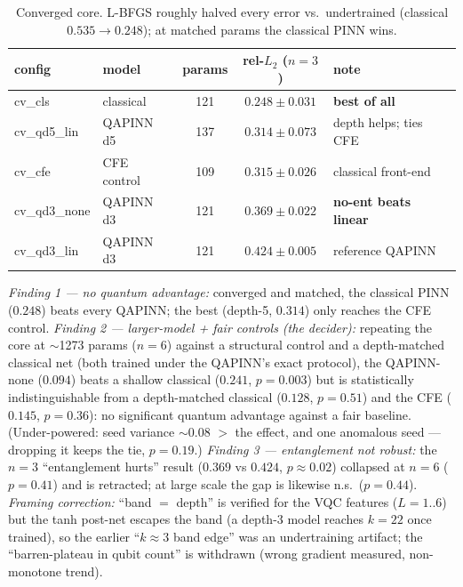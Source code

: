 \documentclass[11pt]{article}
\begin{document}
\begin{table}[h]\centering\small
\begin{tabular}{llcc l}
\toprule
config & model & params & rel-$L_2$ ($n{=}3$) & note \\ \midrule
cv\_cls      & classical    & 121 & $\mathbf{0.248 \pm 0.031}$ & \textbf{best of all} \\
cv\_qd5\_lin & QAPINN d5    & 137 & $0.314 \pm 0.073$ & depth helps; ties CFE \\
cv\_cfe      & CFE control  & 109 & $0.315 \pm 0.026$ & classical front-end \\
cv\_qd3\_none& QAPINN d3    & 121 & $0.369 \pm 0.022$ & \textbf{no-ent beats linear} \\
cv\_qd3\_lin & QAPINN d3    & 121 & $0.424 \pm 0.005$ & reference QAPINN \\
\bottomrule
\end{tabular}
\caption{Converged core. L-BFGS roughly halved every error vs.\ undertrained
(classical $0.535\!\to\!0.248$); at matched params the classical PINN wins.}
\label{tab:converged}
\end{table}

\emph{Finding 1 --- no quantum advantage:} converged and matched, the classical PINN
($0.248$) beats every QAPINN; the best (depth-5, $0.314$) only reaches the CFE
control. \emph{Finding 2 --- larger-model + fair controls (the decider):} repeating
the core at $\sim$1273 params ($n=6$) against a structural control and a
depth-matched classical net (both trained under the QAPINN's exact protocol), the
QAPINN-none ($0.094$) beats a shallow classical ($0.241$, $p=0.003$) but is
statistically indistinguishable from a depth-matched classical ($0.128$, $p=0.51$)
and the CFE ($0.145$, $p=0.36$): no significant quantum advantage against a fair
baseline. (Under-powered: seed variance $\sim$0.08 $>$ the effect, and one anomalous
seed --- dropping it keeps the tie, $p=0.19$.) \emph{Finding 3 --- entanglement not robust:} the
$n=3$ ``entanglement hurts'' result ($0.369$ vs $0.424$, $p\approx0.02$) collapsed at
$n=6$ ($p=0.41$) and is retracted; at large scale the gap is likewise n.s.\ ($p=0.44$).
\emph{Framing correction:} ``band $=$ depth'' is verified for the VQC features
($L{=}1..6$) but the tanh post-net escapes the band (a depth-3 model reaches
$k{=}22$ once trained), so the earlier ``$k\approx3$ band edge'' was an undertraining
artifact; the ``barren-plateau in qubit count'' is withdrawn (wrong gradient
measured, non-monotone trend).
\end{document}
